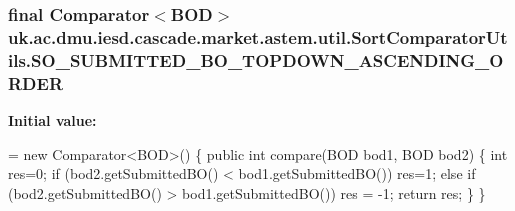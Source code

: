 \hypertarget{classuk_1_1ac_1_1dmu_1_1iesd_1_1cascade_1_1market_1_1astem_1_1util_1_1_sort_comparator_utils_a09ed302dedb5f27fb43c502f143665d3}{
\subsubsection[{S\-O\-\_\-\-S\-U\-B\-M\-I\-T\-T\-E\-D\-\_\-\-B\-O\-\_\-\-T\-O\-P\-D\-O\-W\-N\-\_\-\-A\-S\-C\-E\-N\-D\-I\-N\-G\-\_\-\-O\-R\-D\-E\-R}]{\setlength{\rightskip}{0pt plus 5cm}final Comparator$<${\bf B\-O\-D}$>$ uk.\-ac.\-dmu.\-iesd.\-cascade.\-market.\-astem.\-util.\-Sort\-Comparator\-Utils.\-S\-O\-\_\-\-S\-U\-B\-M\-I\-T\-T\-E\-D\-\_\-\-B\-O\-\_\-\-T\-O\-P\-D\-O\-W\-N\-\_\-\-A\-S\-C\-E\-N\-D\-I\-N\-G\-\_\-\-O\-R\-D\-E\-R\hspace{0.3cm}{\ttfamily [static]}}}\label{classuk_1_1ac_1_1dmu_1_1iesd_1_1cascade_1_1market_1_1astem_1_1util_1_1_sort_comparator_utils_a09ed302dedb5f27fb43c502f143665d3}
{\bfseries Initial value\-:}
\begin{DoxyCode}
=    \textcolor{keyword}{new} Comparator<BOD>() \{
        \textcolor{keyword}{public} \textcolor{keywordtype}{int} compare(BOD bod1, BOD bod2) \{
            \textcolor{keywordtype}{int} res=0;
            \textcolor{keywordflow}{if} (bod2.getSubmittedBO() < bod1.getSubmittedBO())
                res=1;
            \textcolor{keywordflow}{else} \textcolor{keywordflow}{if} (bod2.getSubmittedBO() > bod1.getSubmittedBO())
                res = -1;
            \textcolor{keywordflow}{return} res;
        \}
    \}
\end{DoxyCode}
